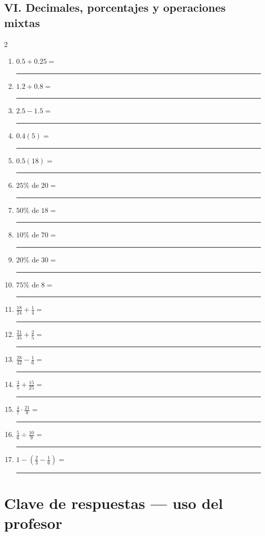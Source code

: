 \documentclass[11pt]{article}
\begin{document}
\subsection*{VI. Decimales, porcentajes y operaciones mixtas}
\begin{multicols}{2}\begin{enumerate}[leftmargin=*,start=84]
\item $\displaystyle 0.5+0.25=$ \rule{2.1cm}{0.4pt}
\item $\displaystyle 1.2+0.8=$ \rule{2.1cm}{0.4pt}
\item $\displaystyle 2.5-1.5=$ \rule{2.1cm}{0.4pt}
\item $\displaystyle 0.4(5)=$ \rule{2.1cm}{0.4pt}
\item $\displaystyle 0.5(18)=$ \rule{2.1cm}{0.4pt}
\item $\displaystyle 25\%\text{ de }20=$ \rule{2.1cm}{0.4pt}
\item $\displaystyle 50\%\text{ de }18=$ \rule{2.1cm}{0.4pt}
\item $\displaystyle 10\%\text{ de }70=$ \rule{2.1cm}{0.4pt}
\item $\displaystyle 20\%\text{ de }30=$ \rule{2.1cm}{0.4pt}
\item $\displaystyle 75\%\text{ de }8=$ \rule{2.1cm}{0.4pt}
\item $\displaystyle \frac{18}{24}+\frac14=$ \rule{2.1cm}{0.4pt}
\item $\displaystyle \frac{21}{35}+\frac25=$ \rule{2.1cm}{0.4pt}
\item $\displaystyle \frac{28}{42}-\frac16=$ \rule{2.1cm}{0.4pt}
\item $\displaystyle \frac35+\frac{15}{25}=$ \rule{2.1cm}{0.4pt}
\item $\displaystyle \frac47\cdot\frac{21}{8}=$ \rule{2.1cm}{0.4pt}
\item $\displaystyle \frac56\div\frac{10}{9}=$ \rule{2.1cm}{0.4pt}
\item $\displaystyle 1-\left(\frac23-\frac16\right)=$ \rule{2.1cm}{0.4pt}
\end{enumerate}\end{multicols}

\newpage
\section*{Clave de respuestas --- uso del profesor}
\end{document}
